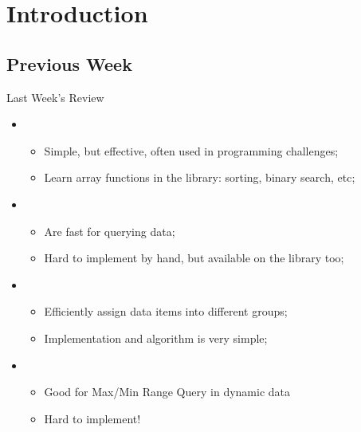 \section{Introduction}

\subsection{Previous Week}
\begin{frame}{Last Week's Review}
  \begin{itemize}
  \item {}
    \begin{itemize}
    \item Simple, but effective, often used in programming challenges;
    \item Learn array functions in the library: sorting, binary search, etc;
    \end{itemize}

    \medskip

  \item {}
    \begin{itemize}
    \item Are fast for querying data;
    \item Hard to implement by hand, but available on the library too;
    \end{itemize}

    \medskip

  \item {}
    \begin{itemize}
    \item Efficiently assign data items into different groups;
    \item Implementation and algorithm is very simple;
    \end{itemize}

    \medskip

  \item {}
    \begin{itemize}
    \item Good for Max/Min Range Query in dynamic data
    \item Hard to implement!
    \end{itemize}
  \end{itemize}
\end{frame}


